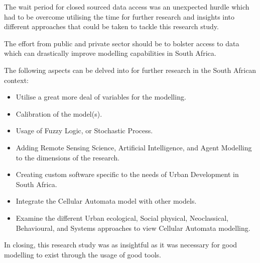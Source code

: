 The wait period for closed sourced data access was an unexpected hurdle which had to be overcome utilising the time for further research and insights into different approaches that could be taken to tackle this research study.

The effort from public and private sector should be to bolster access to data which can drastically improve modelling capabilities in South Africa.

The following aspects can be delved into for further research in the South African context:
\begin{itemize}
\item Utilise a great more deal of variables for the modelling.
\item Calibration of the model(s).
\item Usage of Fuzzy Logic, or Stochastic Process.
\item Adding Remote Sensing Science, Artificial Intelligence, and Agent Modelling to the dimensions of the research.
\item Creating custom software specific to the needs of Urban Development in South Africa.
\item Integrate the Cellular Automata model with other models.
\item Examine the different Urban ecological, Social physical, Neoclassical, Behavioural, and Systems approaches to view Cellular Automata modelling.
\end{itemize}
In closing, this research study was as insightful as it was necessary for good modelling to exist through the usage of good tools.